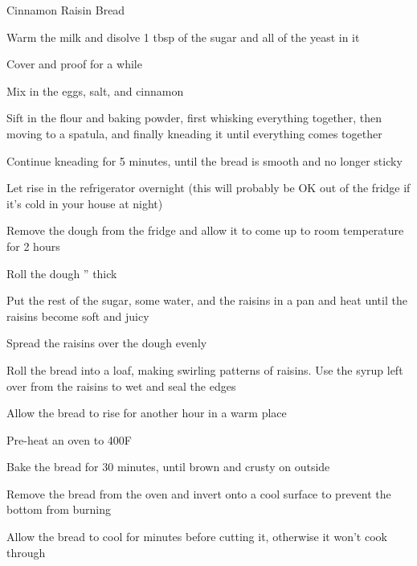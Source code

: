 \documentclass{recipe}
\begin{document}
\begin{recipe}{Cinnamon Raisin Bread}
  \begin{steps}
  \item Warm the milk and disolve 1 tbsp of the sugar and all of the
    yeast in it
  \item Cover and proof for a while
  \item Mix in the eggs, salt, and cinnamon
  \item Sift in the flour and baking powder, first whisking everything
    together, then moving to a spatula, and finally kneading it until
    everything comes together
  \item Continue kneading for 5 minutes, until the bread is smooth and
    no longer sticky
  \item Let rise in the refrigerator overnight (this will probably be
    OK out of the fridge if it's cold in your house at night)
  \item Remove the dough from the fridge and allow it to come up to
    room temperature for 2 hours
  \item Roll the dough '' thick
  \item Put the rest of the sugar, some water, and the raisins in a
    pan and heat until the raisins become soft and juicy
  \item Spread the raisins over the dough evenly
  \item Roll the bread into a loaf, making swirling patterns of
    raisins.  Use the syrup left over from the raisins to wet and seal
    the edges
  \item Allow the bread to rise for another hour in a warm place
  \item Pre-heat an oven to 400\degree F
  \item Bake the bread for 30 minutes, until brown and crusty on outside
  \item Remove the bread from the oven and invert onto a cool surface
    to prevent the bottom from burning
  \item Allow the bread to cool for minutes before cutting it,
    otherwise it won't cook through
  \end{steps}
\end{recipe}
\end{document}
